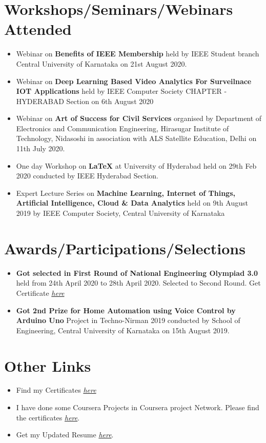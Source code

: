 \documentclass[]{article}
\begin{document}
    \section*{Workshops/Seminars/Webinars Attended}
    \begin{itemize}
        \item Webinar on \textbf{Benefits of IEEE Membership} held by IEEE Student branch Central University of Karnataka on 21st August 2020.
        \item Webinar on\textbf{ Deep Learning Based Video Analytics For Surveilnace IOT Applications} held by IEEE Computer Society CHAPTER -HYDERABAD Section on 6th August 2020
        \item Webinar on \textbf{Art of Success for Civil Services} organised by Department of Electronics and Communication Engineering, Hirasugar Institute of Technology, Nidasoshi in association with ALS Satellite Education, Delhi on 11th July 2020.
        \item One day Workshop on \textbf{LaTeX} at University of Hyderabad held on 29th Feb 2020 conducted by IEEE Hyderabad Section.
        \item Expert Lecture Series on \textbf{Machine Learning, Internet of Things, Artificial Intelligence, Cloud \& Data Analytics}
        held on 9th August 2019 by IEEE Computer Society, Central University of Karnataka
    \end{itemize}
    \newpage
    \section*{Awards/Participations/Selections}
    \begin{itemize}
    	\item \textbf{Got selected in First Round of National Engineering Olympiad 3.0} held from 24th April 2020 to 28th April 2020. Selected to Second Round. Get Certificate \href{https://drive.google.com/drive/u/0/folders/1afmjGeQ6c10q58FP6xpgcYjkM3Um7R69}{\em here}
        \item \textbf{Got 2nd Prize for Home Automation using Voice Control by Arduino Uno} Project in Techno-Nirman 2019 conducted by School of Engineering, Central University of Karnataka on 15th August 2019.
    \end{itemize}
    \section*{Other Links}
    \begin{itemize}
    \item Find my Certificates \href{https://drive.google.com/drive/folders/1afmjGeQ6c10q58FP6xpgcYjkM3Um7R69?usp=sharing}{\em here}
    \item I have done some Coursera Projects in Coursera project Network. Please find the certificates \href{https://drive.google.com/drive/u/0/folders/187CiSJKh_43Vlr-XUnmirNDy3oFicABx}{\em here}.
    \item Get my Updated Resume \href{https://drive.google.com/drive/u/0/folders/1Ks9H7XrgT2znM308pEK3dR7cAzpoCPiZ}{\em here}.
    
    \end{itemize}
    
    
\end{document}
